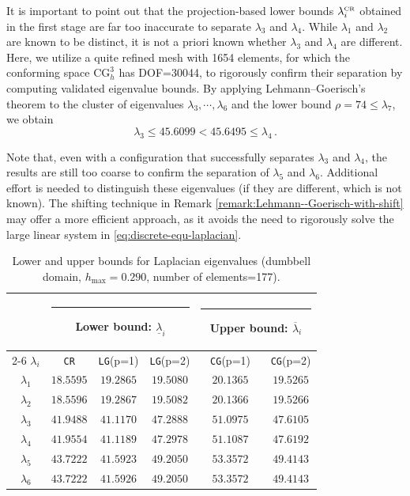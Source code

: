 \documentclass[a4,11pt]{article}
\numberwithin{equation}{section}
\newcommand{\CR}{\mbox{\tiny{CR}}}
\begin{document}
It is important to point out that the projection-based lower bounds $\lambda_i^{\CR}$ obtained in the first stage are far too inaccurate to separate $\lambda_3$ and $\lambda_4$.
 While $\lambda_1$ and $\lambda_2$ are known to be distinct, it is not a priori known whether $\lambda_3$ and $\lambda_4$ are different. 
 Here, we utilize a quite refined mesh with 1654 elements, for which the  conforming space $\text{CG}_h^3 $ has DOF=30044,  to rigorously confirm their separation by computing validated eigenvalue bounds. By applying  Lehmann--Goerisch's theorem to the cluster of eigenvalues  $\lambda_3, \cdots, \lambda_6$ and the lower bound $\rho=74\le \lambda_7$, we obtain
 \begin{equation}
\label{eq:separate_3_and_4}
\lambda_3 \le 45.6099 < 45.6495 \le \lambda_4\, . 
\end{equation}

Note that, even with a configuration that successfully separates $\lambda_3$ and $\lambda_4$, the results are still too coarse to confirm the separation of $\lambda_5$ and $\lambda_6$. Additional effort is needed to distinguish these eigenvalues (if they are different, which is not known). The shifting technique in Remark \ref{remark:Lehmann--Goerisch-with-shift} may offer a more efficient approach, as it avoids the need to rigorously solve the large linear system in \eqref{eq:discrete-equ-laplacian}.
 



\begin{table}
\renewcommand{\arraystretch}{1.2}
\begin{center}
\caption{\label{table:bounds_laplacian_dumbbell} Lower and upper bounds for Laplacian eigenvalues (dumbbell domain, $h_{\max} =0.290$, number of elements=177). }
	\begin{tabular}{|c|c|c|c|c|c|}
\hline
 \multicolumn{1}{|c|}{\quad} & \multicolumn{3}{|c|}{\rule[-0.2cm]{0.cm}{0.6cm}
Lower bound: $\underline{\lambda}_i$} & \multicolumn{2}{|c|}{\rule[-0.2cm]{0.cm}{0.6cm}
Upper bound: $\overline{\lambda}_i$}\\
\cline{2-6}
$\lambda_i$	 & \texttt{CR} & \texttt{LG}(p=1) &\texttt{LG}(p=2) &~ \texttt{CG}(p=1) ~ &\texttt{CG}(p=2) \\
\hline
$\lambda_1$ &  $18.5595$ & $19.2865$ & $19.5080$ & $20.1365$ & $19.5265$ \\ \hline 
$\lambda_2$ &  $18.5596$ & $19.2867$ & $19.5082$ & $20.1366$ & $19.5266$ \\ \hline 
$\lambda_3$ &  $41.9488$ & $41.1170$ & $47.2888$ & $51.0975$ & $47.6105$ \\ \hline 
$\lambda_4$ &  $41.9554$ & $41.1189$ & $47.2978$ & $51.1087$ & $47.6192$ \\ \hline 
$\lambda_5$ &  $43.7222$ & $41.5923$ & $49.2050$ & $53.3572$ & $49.4143$ \\ \hline 
$\lambda_6$ &  $43.7222$ & $41.5926$ & $49.2050$ & $53.3572$ & $49.4143$ \\ \hline \end{tabular}
\end{center}
\end{table}
\end{document}
